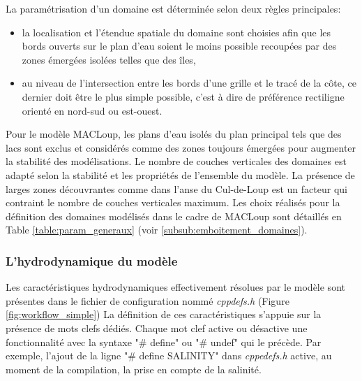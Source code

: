 \documentclass[10pt,a4paper,titlepage]{article}
\begin{document}
La paramétrisation d'un domaine est déterminée selon deux règles principales:
\begin{itemize}
	\item la localisation et l'étendue spatiale du domaine sont choisies afin que les bords ouverts sur le plan d'eau soient le moins possible recoupées par des zones émergées isolées telles que des îles,
	\item au niveau de l'intersection entre les bords d'une grille et le tracé de la côte, ce dernier doit être le plus simple possible, c'est à dire de préférence rectiligne orienté en nord-sud ou est-ouest.
\end{itemize}

Pour le modèle MACLoup, les plans d'eau isolés du plan principal tels que des lacs sont exclus et considérés comme des zones toujours émergées pour augmenter la stabilité des modélisations.
Le nombre de couches verticales des domaines est adapté selon la stabilité et les propriétés de l'ensemble du modèle.
La présence de larges zones découvrantes comme dans l'anse du Cul-de-Loup est un facteur qui contraint le nombre de couches verticales maximum.
Les choix réalisés pour la définition des domaines modélisés dans le cadre de MACLoup sont détaillés en Table \ref{table:param_generaux} (voir \ref{subsub:emboitement_domaines}).



\subsubsection{L'hydrodynamique du modèle}
\label{subsub:physique_modele}

Les caractéristiques hydrodynamiques effectivement résolues par le modèle sont présentes dans le fichier de configuration nommé \textit{cppdefs.h} (Figure \ref{fig:workflow_simple})
La définition de ces caractéristiques s'appuie sur la présence de mots clefs dédiés.
Chaque mot clef active ou désactive une fonctionnalité avec la syntaxe "\# define"  ou "\# undef" qui le précède.
Par exemple, l'ajout de la ligne "\# define SALINITY" dans \textit{cppedefs.h} active, au moment de la compilation, la prise en compte de la salinité.


\end{document}

